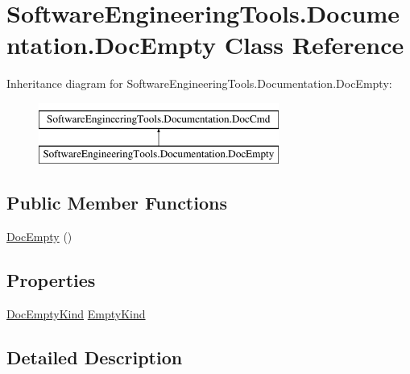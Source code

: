 \hypertarget{class_software_engineering_tools_1_1_documentation_1_1_doc_empty}{\section{Software\+Engineering\+Tools.\+Documentation.\+Doc\+Empty Class Reference}
\label{class_software_engineering_tools_1_1_documentation_1_1_doc_empty}
}
Inheritance diagram for Software\+Engineering\+Tools.\+Documentation.\+Doc\+Empty\+:\begin{figure}[H]
\begin{center}
\leavevmode
\includegraphics[height=2.000000cm]{class_software_engineering_tools_1_1_documentation_1_1_doc_empty}
\end{center}
\end{figure}
\subsection*{Public Member Functions}
\begin{DoxyCompactItemize}
\item 
\hyperlink{class_software_engineering_tools_1_1_documentation_1_1_doc_empty_adc90b20452309d000ebe98d8b1b1eda5}{Doc\+Empty} ()
\end{DoxyCompactItemize}
\subsection*{Properties}
\begin{DoxyCompactItemize}
\item 
\hyperlink{namespace_software_engineering_tools_1_1_documentation_a4a8017aa254d1d05b03db5132b7dd3a7}{Doc\+Empty\+Kind} \hyperlink{class_software_engineering_tools_1_1_documentation_1_1_doc_empty_a193949a8c51dd660fb77a8b6f419f9ea}{Empty\+Kind}
\end{DoxyCompactItemize}


\subsection{Detailed Description}


